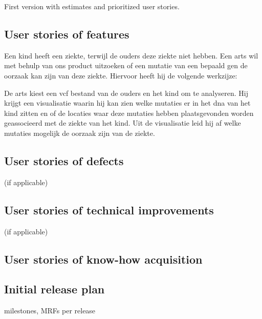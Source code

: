 First version with estimates and prioritized user stories.
		\subsection{User stories of features}
Een kind heeft een ziekte, terwijl de ouders deze ziekte niet hebben.
Een arts wil met behulp van ons product uitzoeken of een mutatie van een bepaald gen de oorzaak kan zijn van deze ziekte.
Hiervoor heeft hij de volgende werkzijze:

De arts kiest een vcf bestand van de ouders en het kind om te analyseren.
Hij krijgt een visualisatie waarin hij kan zien welke mutaties er in het dna van het kind zitten en of de locaties waar deze mutaties hebben plaatsgevonden worden geassocieerd met de ziekte van het kind.
Uit de visualisatie leid hij af welke mutaties mogelijk de oorzaak zijn van de ziekte.
		\subsection{User stories of defects}
			(if applicable)
		\subsection{User stories of technical improvements}
			(if applicable)
		\subsection{User stories of know-how acquisition}
		\subsection{Initial release plan}
			milestones, MRFs per release
